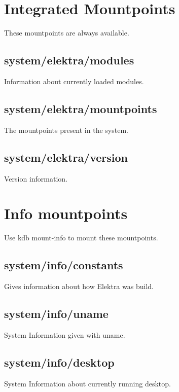 \hypertarget{md_doc_help_elektra-hierarchy_doc_help_elektra-hierarchy_md}{}\section{Integrated Mountpoints}\label{md_doc_help_elektra-hierarchy_doc_help_elektra-hierarchy_md}
These mountpoints are always available.

\subsection*{system/elektra/modules}

Information about currently loaded modules.

\subsection*{system/elektra/mountpoints}

The mountpoints present in the system.

\subsection*{system/elektra/version}

Version information.

\section*{Info mountpoints}

Use {\ttfamily kdb mount-\/info} to mount these mountpoints.

\subsection*{system/info/constants}

Gives information about how Elektra was build.

\subsection*{system/info/uname}

System Information given with {\ttfamily uname}.

\subsection*{system/info/desktop}

System Information about currently running desktop.

